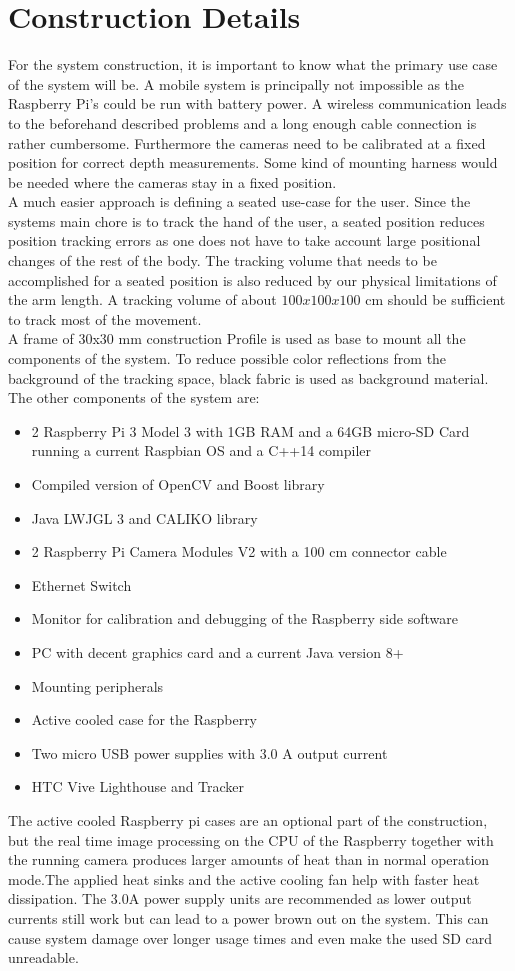 \section{Construction Details}
For the system construction, it is important to know what the primary use case of the system will be. A mobile system is principally not impossible as the Raspberry Pi's could be run with battery power. A wireless communication leads to the beforehand described problems and a long enough cable connection is rather cumbersome. Furthermore the cameras need to be calibrated at a fixed position for correct depth measurements. Some kind of mounting harness would be needed where the cameras stay in a fixed position.\\
A much easier approach is defining a seated use-case for the user. Since the systems main chore is to track the hand of the user, a seated position reduces position tracking errors as one does not have to take account large positional changes of the rest of the body.
The tracking volume that needs to be accomplished for a seated position is also reduced by our physical limitations of the arm length. A tracking volume of about $100x100x100$ cm should be sufficient to track most of the movement.\\
A frame of 30x30 mm construction Profile is used as base to mount all the components of the system. To reduce possible color reflections from the background of the tracking space, black fabric is used as background material. The other components of the system are:
\begin{itemize}
\item 2 Raspberry Pi 3 Model 3 with 1GB RAM and a 64GB micro-SD Card running a current Raspbian OS and a C++14 compiler
\item Compiled version of OpenCV and Boost library
\item Java LWJGL 3 and CALIKO library
\item 2 Raspberry Pi Camera Modules V2 with a 100 cm connector cable
\item Ethernet Switch
\item Monitor for calibration and debugging of the Raspberry side software
\item PC with decent graphics card and a current Java version 8+
\item Mounting peripherals
\item Active cooled case for the Raspberry
\item Two micro USB power supplies with 3.0 A output current
\item HTC Vive Lighthouse and Tracker
\end{itemize}
The active cooled Raspberry pi cases are an optional part of the construction, but the real time image processing on the CPU of the Raspberry together with the running camera produces larger amounts of heat than in normal operation mode.The applied heat sinks and the active cooling fan help with faster heat dissipation. The 3.0A power supply units are recommended as lower output currents still work but can lead to a power brown out on the system. This can cause system damage over longer usage times and even make the used SD card unreadable.
